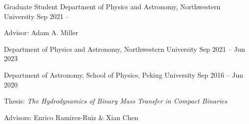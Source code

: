 


\begin{cventries}



\cvsimpentry
{Graduate Student} %
{Department of Physics and Astronomy, Northwestern University} %
{Sep 2021 -- } %
{ \begin{cvitems}
	\item {Advisor: Adam A. Miller}
\end{cvitems}
}

\cvsimpentry
{} %
{Department of Physics and Astronomy, Northwestern University} %
{Sep 2021 -- Jun 2023} %
{}

\cvsimpentry
{} %
{Department of Astronomy, School of Physics, Peking University} %
{Sep 2016 -- Jun 2020} %
{ %
	\begin{cvitems}
		\item {Thesis: \textit{The Hydrodynamics of Binary Mass Transfer in Compact Binaries}}
		\item {Advisors: Enrico Ramirez-Ruiz \& Xian Chen}
	\end{cvitems}
}

\end{cventries}